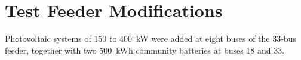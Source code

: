 \chapter{Test Feeder Modifications}
\label{app:a}

Photovoltaic systems of 150 to 400~kW were added at eight buses of the 33-bus feeder, together
with two 500~kWh community batteries at buses 18 and 33.
